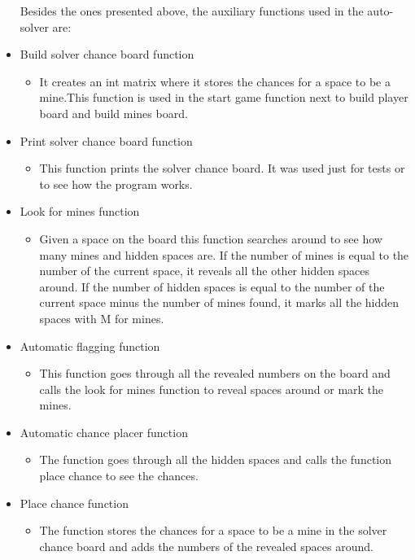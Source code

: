 \documentclass{article}
\begin{document}
\begin{itemize}
        
 Besides the ones presented above, the auxiliary functions used in the auto-solver are:
    \item Build solver chance board function
        \begin{itemize}
        \item It creates an int matrix where it stores the chances for a space to be a mine.This function is used in the start game function next to build player board and build mines board.
        \end{itemize}
        
    \item Print solver chance board function
        \begin{itemize}
        \item This function prints the solver chance board. It was used just for tests or to see how the program works.
        \end{itemize}
        
    \item Look for mines function
        \begin{itemize}
        \item Given a space on the board this function searches around to see how many mines and hidden spaces are. If the number of mines is equal to the number of the current space, it reveals all the other hidden spaces around. If the number of hidden spaces is equal to the number of the current space minus the number of mines found, it marks all the hidden spaces with M for mines.
        \end{itemize}
        
    \item Automatic flagging function
        \begin{itemize}
        \item This function goes through all the revealed numbers on the board and calls the look for mines function to reveal spaces around or mark the mines.
        \end{itemize}
        
     \item Automatic chance placer function
        \begin{itemize}
        \item The function goes through all the hidden spaces and calls the function place chance to see the chances.
        \end{itemize}
        
     \item Place chance function
        \begin{itemize}
        \item The function stores the chances for a space to be a mine in the solver chance board and adds the numbers of the revealed spaces around.
        \end{itemize}
        

\end{itemize}
\end{document}
